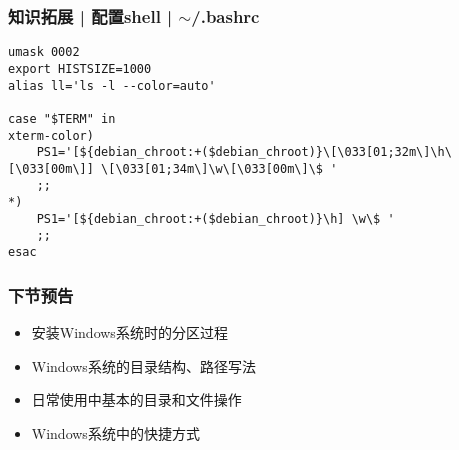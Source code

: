 \begin{frame}[fragile]
  \frametitle{知识拓展 | 配置shell | $\sim$/.bashrc}
\begin{lstlisting}
umask 0002
export HISTSIZE=1000
alias ll='ls -l --color=auto'

case "$TERM" in
xterm-color)
    PS1='[${debian_chroot:+($debian_chroot)}\[\033[01;32m\]\h\[\033[00m\]] \[\033[01;34m\]\w\[\033[00m\]\$ '
    ;;
*)
    PS1='[${debian_chroot:+($debian_chroot)}\h] \w\$ '
    ;;
esac
\end{lstlisting}
\end{frame}

\begin{frame}
  \frametitle{下节预告}
  \begin{itemize}
    \item 安装Windows系统时的分区过程
    \item Windows系统的目录结构、路径写法
    \item 日常使用中基本的目录和文件操作
    \item Windows系统中的快捷方式
  \end{itemize}
\end{frame}


